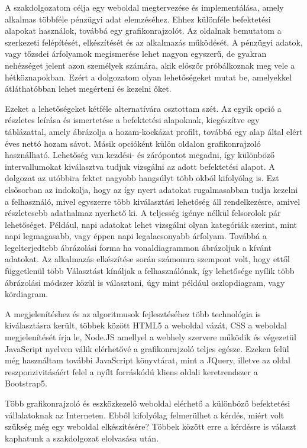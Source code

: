 
	A szakdolgozatom célja egy weboldal megtervezése és implementálása, amely alkalmas többféle pénzügyi adat elemzéséhez. Ehhez különféle befektetési alapokat használok, továbbá egy grafikonrajzolót. Az oldalnak bemutatom a szerkezeti felépítését, elkészítését és az alkalmazás működését.
	A pénzügyi adatok, vagy tőzsdei árfolyamok megismerése lehet nagyon egyszerű, de gyakran nehézséget jelent azon személyek számára, akik előszőr próbálkoznak meg vele a hétköznapokban. Ezért a dolgozatom olyan lehetőségeket mutat be, amelyekkel átláthatóbban lehet megérteni és kezelni őket.

	Ezeket a lehetőségeket kétféle alternatívára osztottam szét. Az egyik opció a részletes leírása és ismertetése a befektetési alapoknak, kiegészítve egy táblázattal, amely ábrázolja a hozam-kockázat profilt, továbbá egy alap által elért éves nettó hozam sávot. Másik opcióként külön oldalon grafikonrajzoló használható. Lehetőség van kezdési- és zárópontot megadni, így különböző intervallumokat kiválasztva tudjuk vizsgálni az adott befektetési alapot. A dolgozat az utóbbira fektet nagyobb hangsúlyt több okból kifolyólag is. Ezt elsősorban az indokolja, hogy az így nyert adatokat rugalmasabban tudja kezelni a felhasználó, mivel egyszerre több kiválasztási lehetőség áll rendelkezésre, amivel részletesebb adathalmaz nyerhető ki. A teljesség igénye nélkül felsorolok pár lehetőséget. Például, napi adatokat lehet vizsgálni olyan kategóriák szerint, mint napi legmagasabb, vagy éppen napi legalacsonyabb árfolyam. Továbbá a legelterjedtebb ábrázolási forma ha vonaldiagrammon ábrázoljuk a kívánt adatokat. Az alkalmazás elkészítése során számomra szempont volt, hogy ettől függetlenül több Választást kínáljak a felhasználónak, így lehetősége nyílik több ábrázolási módszer közül is választani, úgy mint például oszlopdiagram, vagy kördiagram.

	A megjelenítéshez és az algoritmusok fejlesztéséhez több technológia is kiválasztásra került, többek között HTML5 a weboldal vázát, CSS a weboldal megjelenítését írja le, Node.JS amellyel a webhely szervere működik és végezetül JavaScript nyelven válik elérhetővé a grafikonrajzoló teljes egésze. Ezeken felül még használtam további JavaScript könyvtárat, mint a JQuery, illetve az oldal reszponzivitásáért felel a nyílt forráskódú kliens oldali keretrendszer a Bootstrap5.

	Több grafikonrajzoló és eszközkezelő weboldal elérhető a különböző befektetési vállalatoknak az Interneten.  Ebből kifolyólag felmerülhet a kérdés, miért volt szükség még egy weboldal elkészítésére? Többek között erre a kérdésre is választ kaphatunk a szakdolgozat elolvasása után.
